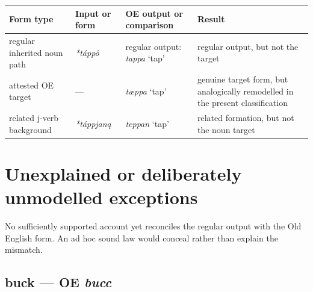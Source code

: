 \documentclass[
  british,
  a4paper,
  openany]{book}
\newcounter{none} %
\providecommand{\texorpdfstring}[2]{#1}
\begin{document}
{\def\LTcaptype{none} %
\begin{longtable}[]{@{}
  >{\raggedright\arraybackslash}p{}
  >{\raggedright\arraybackslash}p{}
  >{\raggedright\arraybackslash}p{}
  >{\raggedright\arraybackslash}p{}@{}}
\toprule\noalign{}
\begin{minipage}[b]{\linewidth}\raggedright
Form type
\end{minipage} & \begin{minipage}[b]{\linewidth}\raggedright
Input or form
\end{minipage} & \begin{minipage}[b]{\linewidth}\raggedright
OE output or comparison
\end{minipage} & \begin{minipage}[b]{\linewidth}\raggedright
Result
\end{minipage} \\
\midrule\noalign{}
\endhead
\bottomrule\noalign{}
\endlastfoot
regular inherited noun path & {\emph{*táppô}} & regular output:
{\emph{tappa}} `tap' & regular output, but not the target \\
attested OE target & --- & {\emph{tæppa}} `tap' & genuine target form,
but analogically remodelled in the present classification \\
related j-verb background & {\emph{*táppjaną}} & {\emph{teppan}} `tap' &
related formation, but not the noun target \\
\end{longtable}
}

\clearpage

\chapter{Unexplained or deliberately unmodelled
exceptions}\label{unexplained-or-deliberately-unmodelled-exceptions}

No sufficiently supported account yet reconciles the regular output with
the Old English form. An ad hoc sound law would conceal rather than
explain the mismatch.

\section{\texorpdfstring{buck --- OE
\emph{bucc}}{buck --- OE bucc}}\label{buck-oe-bucc}
\end{document}

